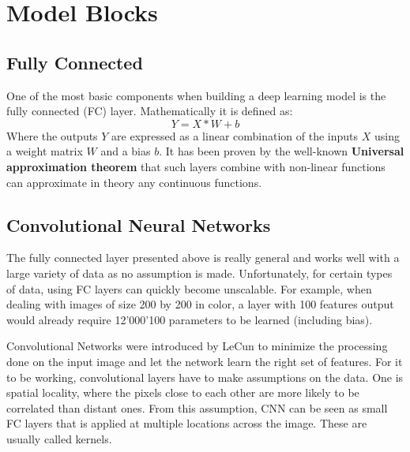 \section{Model Blocks}

\subsection{Fully Connected}

One of the most basic components when building a deep learning model is the fully connected (FC) layer. Mathematically it is defined as:
$$Y=X*W + b$$
Where the outputs $Y$ are expressed as a linear combination of the inputs $X$ using a weight matrix $W$ and a bias $b$. It has been proven by the well-known \textbf{Universal approximation theorem}\cite{universal_approx_theorem_10.5555/70405.70408} that such layers combine with non-linear functions can approximate in theory any continuous functions.

\subsection{Convolutional Neural Networks}

The fully connected layer presented above is really general and works well with a large variety of data as no assumption is made. Unfortunately, for certain types of data, using FC layers can quickly become unscalable. For example, when dealing with images of size 200 by 200 in color, a layer with 100 features output would already require 12'000'100 parameters to be learned (including bias).

Convolutional Networks\cite{cnn_original_paper_10.5555/646469.691875} were introduced by LeCun to minimize the processing done on the input image and let the network learn the right set of features. For it to be working, convolutional layers have to make assumptions on the data. One is spatial locality, where the pixels close to each other are more likely to be correlated than distant ones. From this assumption, CNN can be seen as small FC layers that is applied at multiple locations across the image. These are usually called kernels. 

